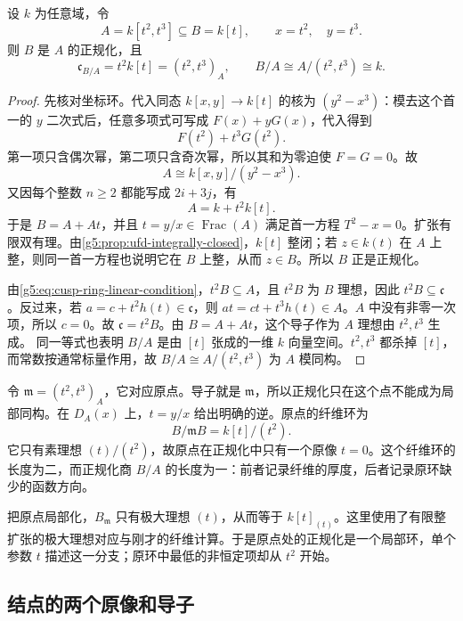 \begin{example}\label{g5:exm:cusp-conductor}
	设 \(k\) 为任意域，令
	\[
	A=k[t^2,t^3]\subseteq B=k[t],\qquad x=t^2,\quad y=t^3.
	\]
	则 \(B\) 是 \(A\) 的正规化，且
	\[
	\mathfrak c_{B/A}=t^2k[t]=(t^2,t^3)_A,
	\qquad B/A\cong A/(t^2,t^3)\cong k.
	\]
\end{example}
\begin{proof}
	先核对坐标环。代入同态 \(k[x,y]\rightarrow k[t]\) 的核为 \((y^2-x^3)\)：模去这个首一的 \(y\) 二次式后，任意多项式可写成 \(F(x)+yG(x)\)，代入得到
	\[
	F(t^2)+t^3G(t^2).
	\]
	第一项只含偶次幂，第二项只含奇次幂，所以其和为零迫使 \(F=G=0\)。故
	\[
	A\cong k[x,y]/(y^2-x^3).
	\]
	又因每个整数 \(n\geq2\) 都能写成 \(2i+3j\)，有
	\begin{equation}\label{g5:eq:cusp-ring-linear-condition}
	A=k+t^2k[t].
	\end{equation}
	于是 \(B=A+At\)，并且 \(t=y/x\in\operatorname{Frac}(A)\) 满足首一方程 \(T^2-x=0\)。扩张有限双有理。由\cref{g5:prop:ufd-integrally-closed}，\(k[t]\) 整闭；若 \(z\in k(t)\) 在 \(A\) 上整，则同一首一方程也说明它在 \(B\) 上整，从而 \(z\in B\)。所以 \(B\) 正是正规化。

	由\eqref{g5:eq:cusp-ring-linear-condition}，\(t^2B\subseteq A\)，且 \(t^2B\) 为 \(B\) 理想，因此 \(t^2B\subseteq\mathfrak c\)。反过来，若 \(a=c+t^2h(t)\in\mathfrak c\)，则 \(at=ct+t^3h(t)\in A\)。\(A\) 中没有非零一次项，所以 \(c=0\)。故 \(\mathfrak c=t^2B\)。由 \(B=A+At\)，这个导子作为 \(A\) 理想由 \(t^2,t^3\) 生成。
	同一等式也表明 \(B/A\) 是由 \([t]\) 张成的一维 \(k\) 向量空间。\(t^2,t^3\) 都杀掉 \([t]\)，而常数按通常标量作用，故 \(B/A\cong A/(t^2,t^3)\) 为 \(A\) 模同构。
\end{proof}

令 \(\mathfrak m=(t^2,t^3)_A\)，它对应原点。导子就是 \(\mathfrak m\)，所以正规化只在这个点不能成为局部同构。在 \(D_A(x)\) 上，\(t=y/x\) 给出明确的逆。原点的纤维环为
\[
	B/\mathfrak mB=k[t]/(t^2).
\]
它只有素理想 \((t)/(t^2)\)，故原点在正规化中只有一个原像 \(t=0\)。这个纤维环的长度为二，而正规化商 \(B/A\) 的长度为一：前者记录纤维的厚度，后者记录原环缺少的函数方向。

\ProseParagraphBreak

把原点局部化，\(B_{\mathfrak m}\) 只有极大理想 \((t)\)，从而等于 \(k[t]_{(t)}\)。这里使用了有限整扩张的极大理想对应与刚才的纤维计算。于是原点处的正规化是一个局部环，单个参数 \(t\) 描述这一分支；原环中最低的非恒定项却从 \(t^2\) 开始。

\subsection{结点的两个原像和导子}
\label{g5:subsec:0403:03}

